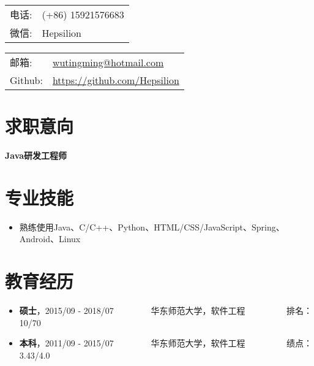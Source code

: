 \documentclass[letterpaper, UTF8, 11pt]{article}
\def\name{\textbf{\textcolor[rgb]{0.00, 0.00, 0.00}{\fontsize{30pt}{30pt}吴庭明}} ~~~~~~~~~ \fontsize{15pt}{15pt}}
\begin{document}
	
	\noindent{\bf \name} 
	\vspace{0.1in}

	\begin{minipage}{0.45\linewidth}
		\begin{tabular}{ll}
			电话:   & (+86) 15921576683 \\
			微信:   & Hepsilion \\
		\end{tabular}
	\end{minipage}
	\begin{minipage}{0.45\linewidth}
		\begin{tabular}{ll}
			邮箱:   & \href{mailto:wutingming@hotmail.com}{ wutingming@hotmail.com} \\
			Github: & \href{https://github.com/Hepsilion}{https://github.com/Hepsilion}\\
		\end{tabular}
	\end{minipage}
	\vspace{-0.1in}
	
	\section*{\textbf{求职意向}}\vspace{-0.12in}
		\textbf{Java研发工程师}
	\vspace{-0.25in}
	
	\section*{\textbf{专业技能}}\vspace{-0.12in}
	\begin{itemize}
		\item 熟练使用Java、C/C++、Python、HTML/CSS/JavaScript、Spring、Android、Linux
	\end{itemize}
	\vspace{-0.32in}
	
	\section*{\textbf{教育经历}}\vspace{-0.12in}
	\begin{itemize}
		\item \textbf{硕士}，2015/09 - 2018/07 ~~~~~~~~华东师范大学，软件工程  ~~~~~~~~~排名：10/70
		\item \textbf{本科}，2011/09 - 2015/07 ~~~~~~~~华东师范大学，软件工程  ~~~~~~~~~绩点：3.43/4.0
	\end{itemize}
	\vspace{-0.32in}
	
\end{document}
